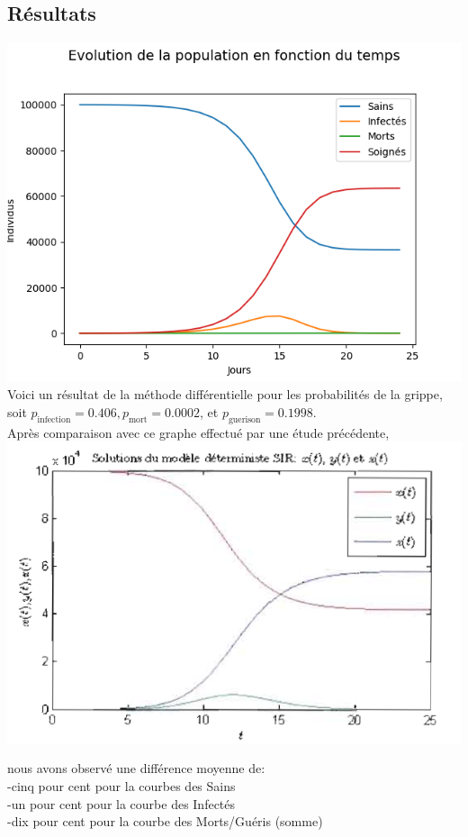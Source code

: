 \documentclass{article}
\begin{document}
\subsection{Résultats}
\includegraphics[scale=1]{../images/diff_grippe.png}\\
	Voici un résultat de la méthode différentielle pour les probabilités de la grippe, soit $p_{\text{infection}} = 0.406, p_{\text{mort}} = 0.0002$, et $p_{\text{guerison}} = 0.1998$. \\
	Après comparaison avec ce graphe effectué par une étude précédente,\\
\includegraphics[scale=01]{../images/diff_comp_article.png}

nous avons observé une différence moyenne de:\\
	-cinq pour cent pour la courbes des Sains\\
	-un pour cent pour la courbe des Infectés\\
	-dix pour cent pour la courbe des Morts/Guéris (somme)
\end{document}
